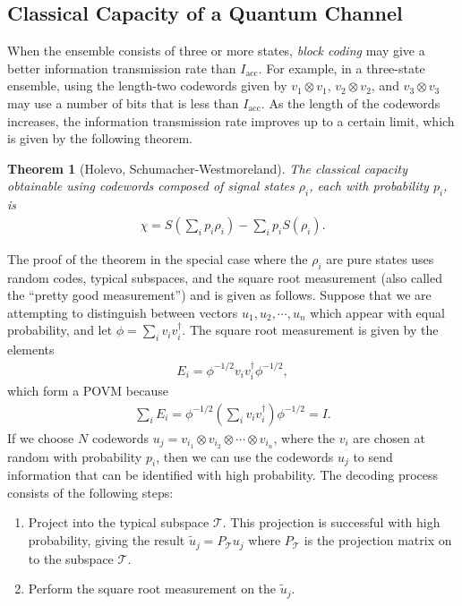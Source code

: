 \documentclass[a4paper, 12pt]{article}
\numberwithin{equation}{section}
\numberwithin{figure}{section}
\newtheorem{theorem}{Theorem}[section]
\theoremstyle{definition}
\begin{document}
    \subsection{Classical Capacity of a Quantum Channel}
    When the ensemble consists of three or more states, \textit{block coding} may give a better information transmission rate than $I_\text{acc}$. For example, in a three-state ensemble, using the length-two codewords given by $v_1 \otimes v_1$, $v_2 \otimes v_2$, and $v_3 \otimes v_3$ may use a number of bits that is less than $I_\text{acc}$. As the length of the codewords increases, the information transmission rate improves up to a certain limit, which is given by the following theorem.
    \begin{theorem}[Holevo, Schumacher-Westmoreland]
        The classical capacity obtainable using codewords composed of signal states $\rho_i$, each with probability $p_i$, is
        \begin{align}
            \chi = S \left( \sum_i p_i \rho_i \right) - \sum_i p_i S(\rho_i). \label{eq:capacity}
        \end{align}
    \end{theorem}
    The proof of the theorem in the special case where the $\rho_i$ are pure states uses random codes, typical subspaces, and the square root measurement (also called the ``pretty good measurement'') and is given as follows. Suppose that we are attempting to distinguish between vectors $u_1, u_2, \cdots, u_n$ which appear with equal probability, and let $\phi = \sum_i v_i v_i^\dagger$. The square root measurement is given by the elements
    \begin{align}
        E_i = \phi^{-1/2} v_i v_i^\dagger \phi^{-1/2},
    \end{align}
    which form a POVM because
    \begin{align}
        \sum_i E_i = \phi^{-1/2} \left( \sum_i v_i v_i^\dagger \right) \phi^{-1/2} = I.
    \end{align}
    If we choose $N$ codewords $u_j = v_{i_1} \otimes v_{i_2} \otimes \cdots \otimes v_{i_n}$, where the $v_i$ are chosen at random with probability $p_i$, then we can use the codewords $u_j$ to send information that can be identified with high probability. The decoding process consists of the following steps:
    \begin{enumerate}
        \item
            Project into the typical subspace $\mathcal{T}$. This projection is successful with high probability, giving the result $\tilde{u}_j = P_\mathcal{T} u_j$ where $P_\mathcal{T}$ is the projection matrix on to the subspace $\mathcal{T}$.

        \item
            Perform the square root measurement on the $\tilde{u}_j$.
    \end{enumerate}
\end{document}

